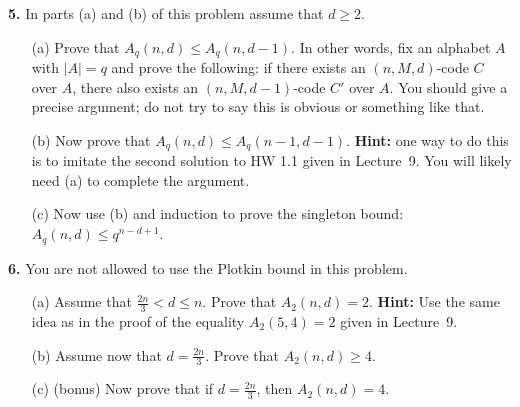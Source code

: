 \documentclass[12pt]{amsart}
\begin{document}
{\bf 5.} In parts (a) and (b) of this problem assume that $d\geq 2$.
\begin{itemize}
\item[(a)] Prove that $A_q(n,d)\leq A_q(n,d-1)$. In other words, fix an alphabet $A$ with $|A|=q$ and prove the following: if there exists
an $(n,M,d)$-code $C$ over $A$, there also exists an $(n,M,d-1)$-code $C'$ over $A$. You should give a precise argument; do not try to say this is obvious or something like that.
\item[(b)] Now prove that $A_q(n,d)\leq A_q(n-1,d-1)$. {\bf Hint:} one way to do this is to imitate the second solution to HW 1.1 given in Lecture~9. You will likely need (a) to complete the argument.
\item[(c)] Now use (b) and induction to prove the singleton bound: $A_q(n,d)\leq q^{n-d+1}$.
\end{itemize}
\skv

{\bf 6.} You are not allowed to use the Plotkin bound in this problem.
\begin{itemize}
\item[(a)] Assume that $\frac{2n}{3}<d\leq n$. Prove that $A_2(n,d)=2$. {\bf Hint:} Use the same idea as in the proof of the equality $A_2(5,4)=2$ given in Lecture~9.
\item[(b)] Assume now that $d=\frac{2n}{3}$. Prove that $A_2(n,d)\geq 4$.
\item[(c)] (bonus) Now prove that if $d=\frac{2n}{3}$, then $A_2(n,d)=4$.
\end{itemize}
\end{document}
